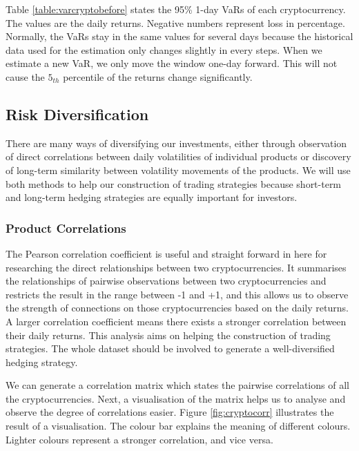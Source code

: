 \documentclass[11pt]{article} %
\theoremstyle{plain}
\theoremstyle{definition}
\begin{document}
Table \ref{table:varcryptobefore} states the 95\% 1-day VaRs of each cryptocurrency. The values are the daily returns. Negative numbers represent loss in percentage. Normally, the VaRs stay in the same values for several days because the historical data used for the estimation only changes slightly in every steps. When we estimate a new VaR, we only move the window one-day forward. This will not cause the $5_{th}$ percentile of the returns change significantly.

\subsection{Risk Diversification}

There are many ways of diversifying our investments, either through observation of direct correlations between daily volatilities of individual products or discovery of long-term similarity between volatility movements of the products. We will use both methods to help our construction of trading strategies because short-term and long-term hedging strategies are equally important for investors.

\subsubsection{Product Correlations}

The Pearson correlation coefficient is useful and straight forward in here for researching the direct relationships between two cryptocurrencies. It summarises the relationships of pairwise observations between two cryptocurrencies and restricts the result in the range between -1 and +1, and this allows us to observe the strength of connections on those cryptocurrencies based on the daily returns. A larger correlation coefficient means there exists a stronger correlation between their daily returns. This analysis aims on helping the construction of trading strategies. The whole dataset should be involved to generate a well-diversified hedging strategy.

We can generate a correlation matrix which states the pairwise correlations of all the cryptocurrencies. Next, a visualisation of the matrix helps us to analyse and observe the degree of correlations easier. Figure \ref{fig:cryptocorr} illustrates the result of a visualisation. The colour bar explains the meaning of different colours. Lighter colours represent a stronger correlation, and vice versa.
\end{document}

